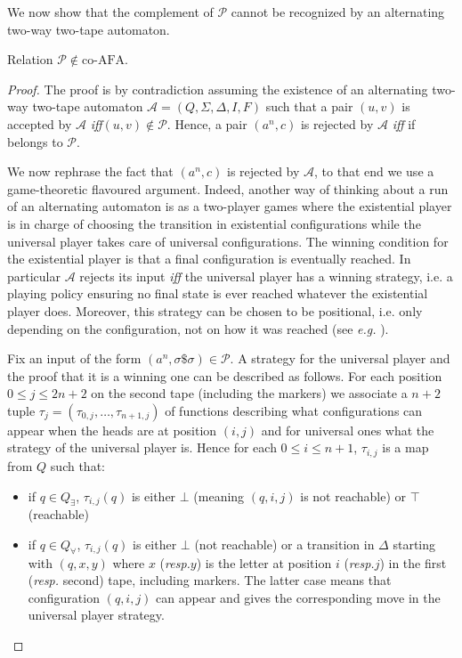 \documentclass[runningheads, envcountsame, a4paper]{llncs}
\newcommand*{\perm}{\mathcal{P}}
\newcommand*{\separator}{\$}
\newcommand*{\ie}{i.e.\xspace}
\newcommand*{\resp}{\emph{resp.}\xspace}
\newcommand*{\eg}{\emph{e.g.}\xspace}
\newcommand*{\ssi}{\emph{iff}\xspace}
\newcommand*{\coAFA}{\mathrm{co}$-$\mathrm{AFA}}
\newcommand*{\alphabet}{\Sigma}
\newcommand*{\atm}{\mathcal{A}}
\newcommand*{\states}{Q}
\newcommand*{\init}{I}
\newcommand*{\final}{F}
\newcommand*{\transrel}{\Delta}
\newcommand*{\amodel}{alternating two-way two-tape automaton\xspace}
\begin{document}
We now show that the complement of $\perm$ cannot be recognized by an \amodel.


\begin{lemma}\label{PnotincoAFA}
  Relation $\perm\notin\coAFA$.
\end{lemma}

\begin{proof}
  The proof is by contradiction assuming the existence of an \amodel
  $\atm=\left(\states, \alphabet, \transrel,\init, \final \right)$ such
  that a pair $(u,v)$ is accepted by $\atm$ \ssi $(u,v)\notin\perm$. Hence,
  a pair $(a^n,c)$ is rejected by $\atm$ \ssi if belongs to $\perm$.
        
  We now rephrase the fact that $(a^n,c)$ is rejected by $\atm$, to that end 
  we use a game-theoretic flavoured argument. Indeed, another way
  of thinking about a run of an alternating automaton is as a two-player games
  where the existential player is in charge of choosing the transition in
  existential configurations while the universal player takes care of
  universal configurations. The winning condition for the existential
  player is that a final configuration is eventually reached. In particular
  $\atm$ rejects its input \ssi the universal player has a winning
  strategy, \ie a playing policy ensuring no final state is
  ever reached whatever the existential player does. Moreover, this
  strategy can be chosen to be positional, \ie only depending on the
  configuration, not on how it was reached (see \eg
  \cite{GradelThomasWilke02}).
        
  Fix an input of the form $(a^n,\sigma \separator\sigma)\in\perm$. A
  strategy for the universal player and the proof that it is a winning one
  can be described as follows. For each position
  $0\leq j\leq 2n+2$ on the second tape (including the markers) we
  associate a $n+2$ tuple $\tau_j=(\tau_{0,j},\dots,\tau_{n+1,j})$ of
  functions describing what configurations can appear when the heads are at
  position $(i,j)$ and for universal ones what the strategy of the universal
  player is. Hence for each $0\leq i\leq n+1$, $\tau_{i,j}$ is a map from
  $Q$ such that:
  \begin{itemize}
  \item if $q\in Q_\exists$, $\tau_{i,j}(q)$ is either $\bot$ (meaning
    $(q,i,j)$ is not reachable) or $\top$ (reachable)
  \item if $q\in Q_\forall$, $\tau_{i,j}(q)$ is either $\bot$ (not
    reachable) or a transition in $\Delta$ starting with $(q,x,y)$ where
    $x$ (\resp $y$) is the letter at position $i$ (\resp $j$) in the first
    (\resp second) tape, including markers. The latter case means that
    configuration $(q,i,j)$ can appear and gives the corresponding move in
    the universal player strategy.
  \end{itemize}
  

\end{proof}
\end{document}
